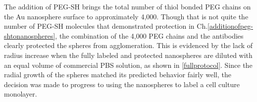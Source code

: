 The addition of PEG-SH brings the total number of thiol bonded PEG chains on the Au nanosphere surface to approximately 4,000. Though that is not quite the number of PEG-SH molecules that demonstrated protection in Ch.\autoref{additionofpeg-shtonanospheres}, the combination of the 4,000 PEG chains and the antibodies clearly protected the spheres from agglomeration. This is evidenced by the lack of radius increase when the fully labeled and protected nanospheres are diluted with an equal volume of commercial PBS solution, as shown in \autoref{fullprotocol}. Since the radial growth of the spheres matched its predicted behavior fairly well, the decision was made to progress to using the nanospheres to label a cell culture monolayer.
